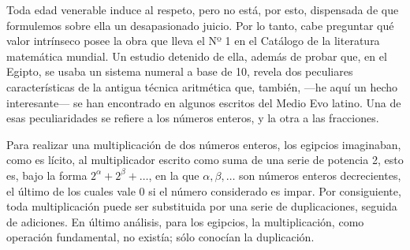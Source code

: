 \documentclass[a4paper, 12pt, draft]{article}
\begin{document}


Toda edad venerable induce al respeto, pero no está, por esto, dispensada de que formulemos sobre ella un desapasionado juicio. Por lo tanto, cabe preguntar qué valor intrínseco posee la obra que lleva el Nº 1 en el Catálogo de la literatura matemática mundial. Un estudio detenido de ella, además de probar que, en el Egipto, se usaba un sistema numeral a base de 10, revela dos peculiares características de la antigua técnica aritmética que, también, ---he aquí un hecho interesante--- se han encontrado en algunos escritos del Medio Evo latino. Una de esas peculiaridades se refiere a los números enteros, y la otra a las fracciones.

Para realizar una multiplicación de dos números enteros, los egipcios imaginaban, como es lícito, al multiplicador escrito como suma de una serie de potencia 2, esto es, bajo la forma $2^\alpha+2^\beta + \dots$, en la que $\alpha,\beta,\dots$ son números enteros decrecientes, el último de los cuales vale 0 si el número considerado es impar. Por consiguiente, toda multiplicación puede ser substituida por una serie de duplicaciones, seguida de adiciones. En último análisis, para los egipcios, la multiplicación, como operación fundamental, no existía; sólo conocían la duplicación.
\end{document}
